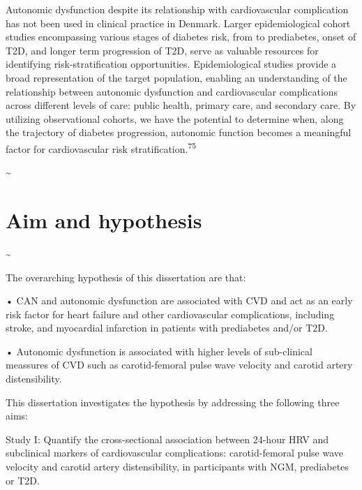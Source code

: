 \documentclass[
  a4paper,
  headsepline=true,
  open=any]{scrbook}
\begin{document}
Autonomic dysfunction despite its relationship with cardiovascular
complication has not been used in clinical practice in Denmark. Larger
epidemiological cohort studies encompassing various stages of diabetes
risk, from to prediabetes, onset of T2D, and longer term progression of
T2D, serve as valuable resources for identifying risk-stratification
opportunities. Epidemiological studies provide a broad representation of
the target population, enabling an understanding of the relationship
between autonomic dysfunction and cardiovascular complications across
different levels of care: public health, primary care, and secondary
care. By utilizing observational cohorts, we have the potential to
determine when, along the trajectory of diabetes progression, autonomic
function becomes a meaningful factor for cardiovascular risk
stratification.\textsuperscript{75}

\newpage

\thispagestyle{empty}

\textasciitilde{} \newpage


\hypertarget{aim-and-hypothesis}{%
\chapter{Aim and hypothesis}\label{aim-and-hypothesis}}

\newpage

\thispagestyle{empty}

\textasciitilde{} \newpage

The overarching hypothesis of this dissertation are that:

• CAN and autonomic dysfunction are associated with CVD and act as an
early risk factor for heart failure and other cardiovascular
complications, including stroke, and myocardial infarction in patients
with prediabetes and/or T2D.

• Autonomic dysfunction is associated with higher levels of sub-clinical
meassures of CVD such as carotid-femoral pulse wave velocity and carotid
artery distensibility.

This dissertation investigates the hypothesis by addressing the
following three aims:

Study I: Quantify the cross-sectional association between 24-hour HRV
and subclinical markers of cardiovascular complications: carotid-femoral
pulse wave velocity and carotid artery distensibility, in participants
with NGM, prediabetes or T2D.
\end{document}
